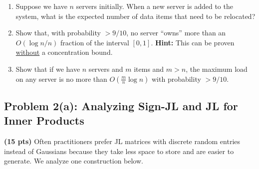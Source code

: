 \documentclass[10pt]{article}
\begin{document}
\begin{enumerate}
	\item Suppose we have $n$ servers initially. When a new server is added to the system, what is the expected number of data items that need to be relocated? 
	
	\item Show that, with probability $>9/10$, no server ``owns'' more than an $O(\log n /n)$ fraction of the interval $[0,1]$. 
	\textbf{Hint:} This can be proven \underline{without} a concentration bound.
	
	\item Show that if we have $n$ servers and $m$ items and $m > n$, the maximum load on any server is no more than $O(\frac{m}{n}\log n)$ with probability $> 9/10$. 
\end{enumerate}


\subsection{Problem 2(a): Analyzing Sign-JL and JL for Inner Products }
\textbf{(15 pts)}
Often practitioners prefer JL matrices with discrete random entries instead of Gaussians because they take less space to store and are easier to generate. We  analyze one construction below.
\end{document}
